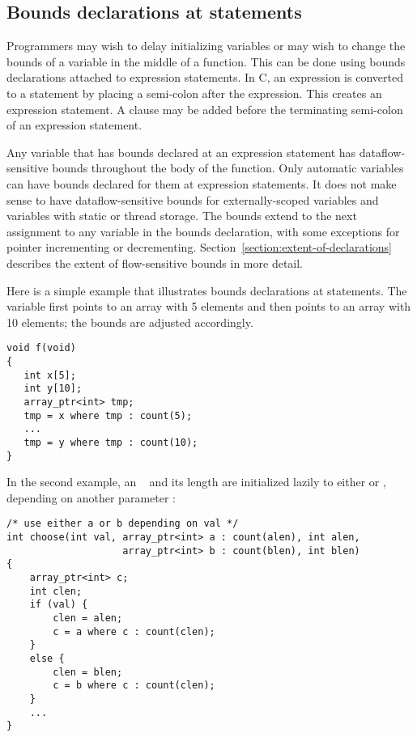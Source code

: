 \subsection{Bounds declarations at statements}
\label{section:statement-declarations}

Programmers may wish to delay initializing variables or may wish to
change the bounds of a variable in the middle of a function. This can be
done using bounds declarations attached to expression statements. In C,
an expression is converted to a statement by placing a semi-colon after
the expression. This creates an expression statement. A 
clause may be added before the terminating semi-colon of an expression
statement.

Any variable that has bounds declared at an expression statement has
dataflow-sensitive bounds throughout the body of the function. Only
automatic variables can have bounds declared for them at expression
statements. It does not make sense to have dataflow-sensitive bounds for
externally-scoped variables and variables with static or thread storage.
The bounds extend to the next assignment to any variable in the bounds
declaration, with some exceptions for pointer incrementing or
decrementing. Section~\ref{section:extent-of-declarations} 
describes the extent of flow-sensitive bounds
in more detail.

Here is a simple example that illustrates bounds declarations at
statements. The variable  first points to an array with 5
elements and then points to an array with 10 elements; the bounds are
adjusted accordingly.

\begin{lstlisting}
void f(void) 
{
   int x[5];
   int y[10];
   array_ptr<int> tmp;
   tmp = x where tmp : count(5);
   ...
   tmp = y where tmp : count(10);
}
\end{lstlisting}

In the second example, an \arrayptr\  and its length are initialized
lazily to either  or , depending on another parameter :

\begin{lstlisting}
/* use either a or b depending on val */
int choose(int val, array_ptr<int> a : count(alen), int alen,
                    array_ptr<int> b : count(blen), int blen) 
{
    array_ptr<int> c;
    int clen;
    if (val) {
        clen = alen;
        c = a where c : count(clen);
    }
    else {
        clen = blen;
        c = b where c : count(clen);
    }    
    ...
}
\end{lstlisting}

